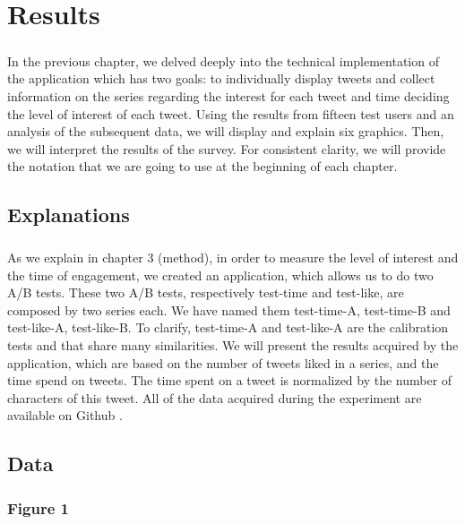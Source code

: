 \chapter{Results}

\paragraph{}
In the previous chapter, we delved deeply into the technical implementation of the application which has two goals: to individually display tweets and collect information on the series regarding the interest for each tweet and time deciding the level of interest of each tweet. Using the results from fifteen test users and an analysis of the subsequent data, we will display and explain six graphics. Then, we will interpret the results of the survey. For consistent clarity, we will provide the notation that we are going to use at the beginning of each chapter.

\section{Explanations}

\paragraph{}
As we explain in chapter 3 (method), in order to measure the level of interest and the time of engagement, we created an application, which allows us to do two A/B tests. These two A/B tests, respectively test-time and test-like, are composed by two series each. We have named them test-time-A, test-time-B and test-like-A, test-like-B. To clarify, test-time-A and test-like-A are the calibration tests and that share many similarities. We will present the results acquired by the application, which are based on the number of tweets liked in a series, and the time spend on tweets. The time spent on a tweet is normalized by the number of characters of this tweet. All of the data acquired during the experiment are available on Github \cite{tw_github}.

\section{Data}

\subsection{Figure 1}

